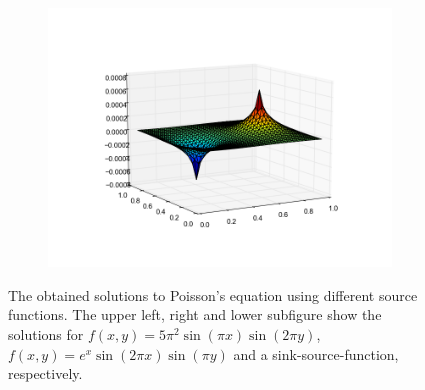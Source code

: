 \begin{figure}[h!]
\begin{subfigure}[b]{0.48\textwidth}
    \includegraphics[width=\textwidth, trim={2.5cm 2cm 2.5cm 2cm}, clip]{./Figures/surfplot_key4_5.png}
  \end{subfigure}
  \vspace{1\baselineskip}
  \caption{The obtained solutions to Poisson's equation using different source functions. The upper left, 
     right and lower subfigure show the solutions for
     $f(x,y) = 5 \pi^2 \sin (\pi \! x ) \sin (2 \! \pi \! y )$,
     $f(x,y) = e^x \sin ( 2 \! \pi \! x )\sin ( \pi \! y )$ and a 
     sink-source-function, respectively. 
     }
  \label{fig:f}
\end{figure}
%
